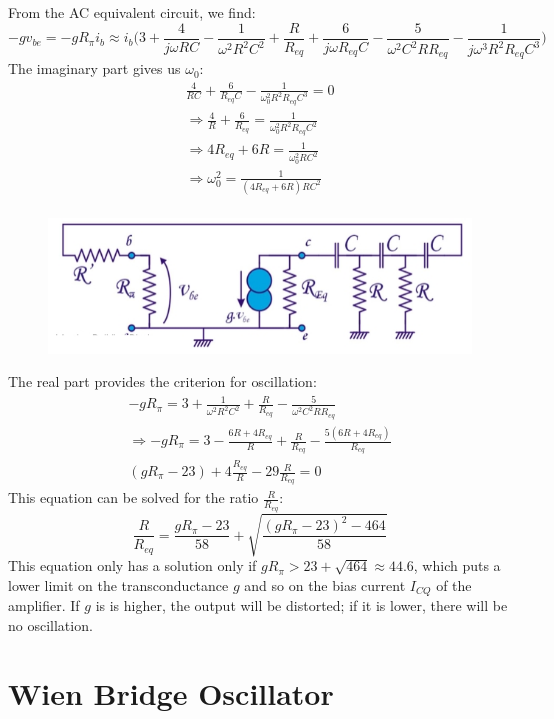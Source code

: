 From the AC equivalent circuit, we find:
$$
-gv_{be} = -gR_\pi i_b \approx i_b \bigg( 3 + \frac{4}{j\omega RC} - \frac{1}{\omega^2 R^2 C^2} + \frac{R}{R_{eq}} + \frac{6}{j\omega R_{eq} C} - \frac{5}{\omega^2C^2RR_{eq}} - \frac{1}{j\omega^3 R^2 R_{eq} C^3} \bigg)
$$
The imaginary part gives us $\omega_0$:
\begin{align*}
	\frac{4}{RC} + \frac{6}{R_{eq} C} - \frac{1}{\omega_0^2 R^2 R_{eq} C^3} = 0\\
	\Rightarrow \frac{4}{R} + \frac{6}{R_{eq}} = \frac{1}{\omega_0^2 R^2 R_{eq} C^2}\\
	\Rightarrow 4R_{eq} + 6R = \frac{1}{\omega_0^2 R C^2}\\
	\Rightarrow  \omega_0^2 = \frac{1}{(4R_{eq} + 6R) R C^2}\\
\end{align*}


\begin{figure}[h!]
	\centering
	\includegraphics[width=12cm]{figures/ch11/phaseshift2.jpg}
	\caption{}
	\label{fig:phaseshift2}
\end{figure}

The real part provides the criterion for oscillation:
\begin{align*}
	-gR_\pi = 3 + \frac{1}{\omega^2 R^2 C^2} + \frac{R}{R_{eq}} - \frac{5}{\omega^2C^2RR_{eq}} \\
	\Rightarrow -gR_\pi = 3 - \frac{6R + 4R_{eq}}{R} + \frac{R}{R_{eq}} - \frac{5(6R + 4R_{eq})}{R_{eq}}\\
	(gR_\pi - 23) + 4 \frac{R_{eq}}{R} - 29 \frac{R}{R_{eq}} = 0
\end{align*}
This equation can be solved for the ratio $\frac{R}{R_{eq}}$:
$$
\frac{R}{R_{eq}} = \frac{gR_\pi - 23}{58} + \sqrt{\frac{(gR_\pi - 23)^2 - 464}{58}}
$$
This equation only has a solution only if $gR_\pi > 23 + \sqrt{464} \approx 44.6$, which puts a lower limit on the transconductance $g$ and so on the bias current $I_{CQ}$ of the amplifier. If $g$ is is higher, the output will be distorted; if it is lower, there will be no oscillation.
\section{Wien Bridge Oscillator}
\label{sec:wien_bridge}

